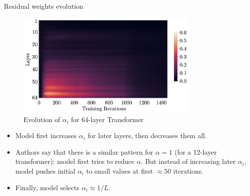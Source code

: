 \documentclass[handout, 10pt]{beamer}
\begin{document}
\begin{frame}{Residual weights evolution}
\begin{figure}
\centering
\includegraphics[width=0.8\textwidth]{images/rezero-weights-evolution}
\caption{Evolution of $\alpha_i$ for 64-layer Transformer}
\end{figure}

\begin{itemize}
    \item\pause Model first increases $\alpha_i$ for later layers, then decreases them all.
    \item\pause Authors say that there is a similar pattern for $\alpha = 1$ (for a 12-layer transformer): model first tries to reduce $\alpha$. But instead of increasing later $\alpha_i$, model pushes initial $\alpha_i$ to small values at first $\approx 50$ iterations.
    \item\pause Finally, model selects $\alpha_i \approx 1/L$.
\end{itemize}
\end{frame}


\end{document}
